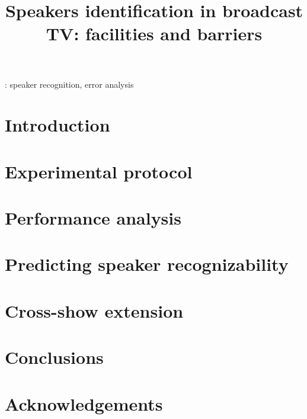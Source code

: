 \documentclass[a4paper]{article}
\title{Speakers identification in broadcast TV: facilities and barriers}
\begin{document}
\maketitle

\begin{abstract}

\end{abstract}

: speaker recognition, error analysis

\section{Introduction}
\label{sec:introduction}


\section{Experimental protocol}
\label{sec:protocol}


\section{Performance analysis}
\label{sec:analysis}


\section{Predicting speaker recognizability}
\label{sec:prediction}


\section{Cross-show extension}
\label{sec:xshow}


\section{Conclusions}
\label{sec:conclusion}


\section{Acknowledgements}

\newpage
\eightpt



\end{document}
